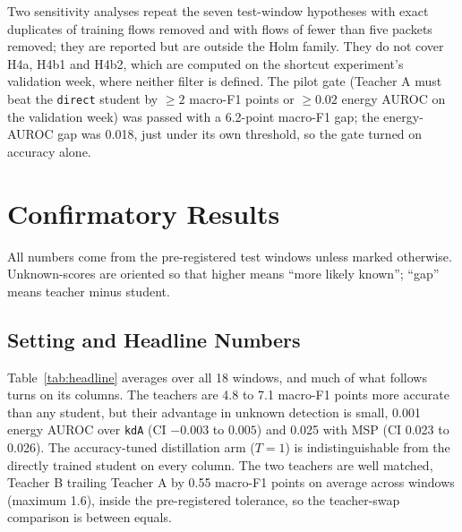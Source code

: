 \documentclass[journal]{IEEEtran}
\newcommand{\kd}[1]{\texttt{#1}}
\begin{document}
Two sensitivity analyses repeat the seven test-window hypotheses with exact duplicates of training flows removed and with flows of fewer than five packets removed; they are reported but are outside the Holm family. They do not cover H4a, H4b1 and H4b2, which are computed on the shortcut experiment's validation week, where neither filter is defined. The pilot gate (Teacher A must beat the \kd{direct} student by $\ge 2$ macro-F1 points or $\ge 0.02$ energy AUROC on the validation week) was passed with a 6.2-point macro-F1 gap; the energy-AUROC gap was 0.018, just under its own threshold, so the gate turned on accuracy alone.

\section{Confirmatory Results}
\label{sec:results}

All numbers come from the pre-registered test windows unless marked otherwise. Unknown-scores are oriented so that higher means ``more likely known''; ``gap'' means teacher minus student.

\subsection{Setting and Headline Numbers}

Table~\ref{tab:headline} averages over all 18 windows, and much of what follows turns on its columns. The teachers are 4.8 to 7.1 macro-F1 points more accurate than any student, but their advantage in unknown detection is small, 0.001 energy AUROC over \kd{kdA} (CI $-0.003$ to $0.005$) and 0.025 with MSP (CI 0.023 to 0.026). The accuracy-tuned distillation arm ($T=1$) is indistinguishable from the directly trained student on every column. The two teachers are well matched, Teacher B trailing Teacher A by 0.55 macro-F1 points on average across windows (maximum 1.6), inside the pre-registered tolerance, so the teacher-swap comparison is between equals.
\end{document}

